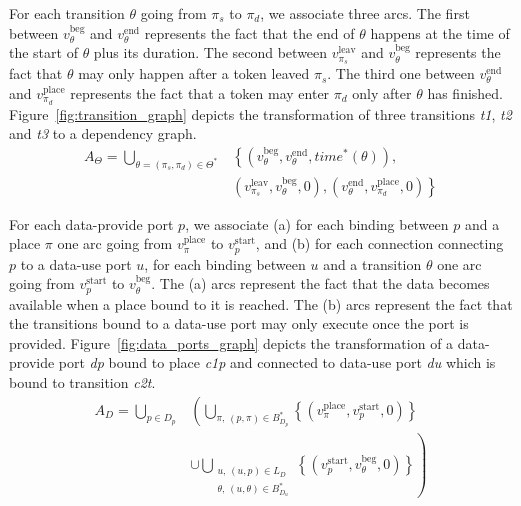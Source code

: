 For each transition $\theta$ going from $\pi_s$ to $\pi_d$, we associate
three arcs. The first between $v_\theta^\text{beg}$ and $v_\theta^\text{end}$
represents the fact that the end of $\theta$ happens at the time of the
start of $\theta$ plus its duration. The second between $v_{\pi_{s}}^\text{leav}$
and $v_\theta^\text{beg}$ represents the fact that $\theta$ may only
happen after a token leaved $\pi_s$. The third one between $v_\theta^\text{end}$ and
$v_{\pi_{d}}^\text{place}$ represents the fact that a token may enter $\pi_d$ only
after $\theta$ has finished.
Figure~\ref{fig:transition_graph} depicts the transformation of three
transitions \emph{t1}, \emph{t2} and \emph{t3} to a dependency graph.
\begin{align*}
A_{\Theta}=\bigcup_{\theta=\left(\pi_{s},\pi_{d}\right)\in\Theta^*} & \left\{ \left(v_\theta^\text{beg},v_\theta^\text{end},time^*\left(\theta\right)\right),\right.\\
 & \left(v_{\pi_{s}}^\text{leav},v_\theta^\text{beg},0\right),\left. \left(v_\theta^\text{end},v_{\pi_{d}}^\text{place},0\right)\right\}
\end{align*}



For each data-provide port $p$, we associate (a) for each binding between
$p$ and a place $\pi$ one arc going from $v_\pi^\text{place}$ to
$v_p^\text{start}$, and (b) for each connection connecting $p$
to a data-use port $u$, for each binding between $u$ and a transition
$\theta$ one arc going from $v_p^\text{start}$ to $v_\theta^\text{beg}$.
The (a) arcs represent the fact that the data becomes
available when a place bound to it is reached. The (b) arcs represent the
fact that the transitions bound to a data-use port may only execute once
the port is provided.
Figure~\ref{fig:data_ports_graph} depicts the transformation of a
data-provide port \emph{dp} bound to place \emph{c1p} and connected to
data-use port \emph{du} which is bound to transition \emph{c2t}.
\begin{align*}
A_{D}=\bigcup_{p\in D_p}
& \left(\bigcup_{\pi,\,\left(p,\pi\right)\in B_{D_{p}}^*}\left\{ \left(v_\pi^\text{place},v_p^\text{start},0\right)\right\}\right. \\
& \left.\cup\bigcup_{\substack{u,\,\left(u,p\right)\in L_D \\
  \theta,\,\left(u,\theta\right)\in B_{D_{u}}^*}}\left\{ \left(v_p^\text{start},v_\theta^\text{beg},0\right)\right\}\right)
\end{align*}

